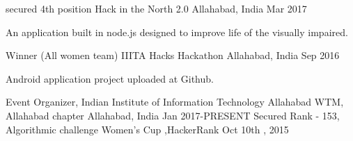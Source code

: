 



\begin{cventries}
\cventry
{secured 4th position} %
{Hack in the North 2.0 } %
{Allahabad, India} %
{Mar 2017} %
{ %
\begin{cvitems}
\item {An application built in node.js designed to improve life of the visually impaired.}
\end{cvitems}
}
\cventry
{ Winner (All women team)} %
{IIITA Hacks Hackathon} %
{Allahabad, India} %
{Sep 2016} %
{ %
\begin{cvitems}
\item {Android application project uploaded at Github.}
\end{cvitems}
}
\cventry
{Event Organizer, Indian Institute of Information Technology
Allahabad} %
{WTM, Allahabad chapter} %
{Allahabad, India} %
{Jan 2017-PRESENT} %
{ 
}
\cventry
{Secured Rank - 153, Algorithmic challenge} %
{Women’s Cup ,HackerRank } %
{} %
{Oct
10th , 2015} %
{ %
}
\end{cventries}